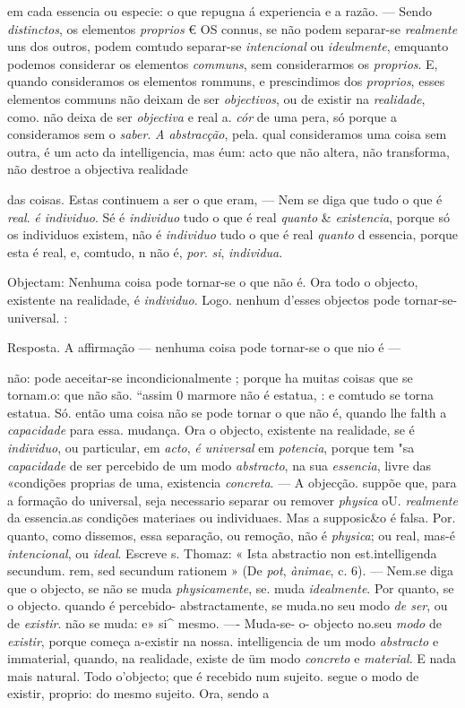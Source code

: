 em cada essencia ou especie: o que repugna á experiencia e a razão. --- Sendo \emph{distinctos}, os elementos \emph{proprios} € OS connus, se não podem separar-se \emph{realmente} uns dos outros, podem comtudo separar-se \emph{intencional} ou \emph{ideulmente}, emquanto podemos considerar os elementos \emph{communs}, sem considerarmos os \emph{proprios}. E, quando consideramos os elementos rommuns, e prescindimos dos \emph{proprios}, esses elementos communs não deixam de ser \emph{objectivos}, ou de existir na \emph{realidade}, como. não deixa de ser \emph{objectiva} e real a. \emph{cór} de uma pera, só porque a consideramos sem o \emph{saber}. \emph{A abstracção}, pela. qual consideramos uma coisa sem outra, é um acto da intelligencia, mas éum: acto que não altera, não transforma, não destroe a objectiva realidade\par das coisas. Estas continuem a ser o que eram, --- Nem se diga que tudo o que é \emph{real}. \emph{é individuo}. Sé é \emph{individuo} tudo o que é real \emph{quanto} \& \emph{existencia}, porque só os individuos existem, não é \emph{individuo} tudo o que é real \emph{quanto} d essencia, porque esta é real, e, comtudo, n não é, \emph{por}. \emph{si}, \emph{individua}.\par Objectam: Nenhuma coisa pode tornar-se o que não é. Ora todo o objecto, existente na realidade, é \emph{individuo}. Logo. nenhum d'esses objectos pode tornar-se- universal. :\par Resposta. A affirmação --- nenhuma coisa pode tornar-se o que nio é ---\par não: pode aeceitar-se incondicionalmente ; porque ha muitas coisas que se tornam.o: que não são. “assim 0 marmore não é estatua, : e comtudo se torna estatua. Só. então uma coisa não se pode tornar o que não é, quando lhe falth a \emph{capacidade} para essa. mudança. Ora o objecto, existente na realidade, se é \emph{individuo}, ou particular, em \emph{acto}, \emph{é universal} em \emph{potencia}, porque tem "sa \emph{capacidade} de ser percebido de um modo \emph{abstracto}, na sua \emph{essencia}, livre das «condições proprias de uma, existencia \emph{concreta}. --- A objecção. suppõe que, para a formação do universal, seja necessario separar ou remover \emph{physica} oU. \emph{realmente} da essencia.as condições materiaes ou individuaes. Mas a supposic\&o é falsa. Por. quanto, como dissemos, essa separação, ou remoção, não é \emph{physica}; ou real, mas-é \emph{intencional}, ou \emph{ideal}. Escreve s. Thomaz: « Ista abstractio non est.intelligenda secundum. rem, sed secundum rationem » (De \emph{pot}, \emph{ànimae}, c. 6). --- Nem.se diga que o objecto, se não se muda \emph{physicamente}, se. muda \emph{idealmente}. Por quanto, se o objecto. quando é percebido- abstractamente, se muda.no seu modo \emph{de ser}, ou de \emph{existir}. não se muda: e» si\textasciicircum{} mesmo. ---- Muda-se- o- objecto no.seu \emph{modo} de \emph{existir}, porque começa a-existir na nossa. intelligencia de um modo \emph{abstracto} e immaterial, quando, na realidade, existe de üm modo \emph{concreto} e \emph{material}. E nada mais natural. Todo o'objecto; que é recebido num sujeito. segue o modo de existir, proprio: do mesmo sujeito. Ora, sendo a 